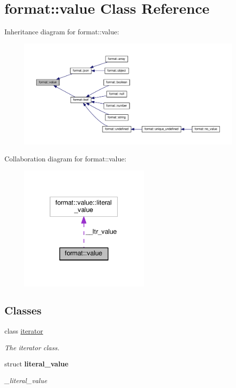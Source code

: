 \hypertarget{classformat_1_1value}{}\section{format\+:\+:value Class Reference}
\label{classformat_1_1value}


Inheritance diagram for format\+:\+:value\+:
\nopagebreak
\begin{figure}[H]
\begin{center}
\leavevmode
\includegraphics[width=350pt]{classformat_1_1value__inherit__graph}
\end{center}
\end{figure}


Collaboration diagram for format\+:\+:value\+:
\nopagebreak
\begin{figure}[H]
\begin{center}
\leavevmode
\includegraphics[width=183pt]{classformat_1_1value__coll__graph}
\end{center}
\end{figure}
\subsection*{Classes}
\begin{DoxyCompactItemize}
\item 
class \hyperlink{classformat_1_1value_1_1iterator}{iterator}
\begin{DoxyCompactList}\small\item\em The iterator class. \end{DoxyCompactList}\item 
struct {\bfseries literal\+\_\+value}
\begin{DoxyCompactList}\small\item\em \+\_\+literal\+\_\+value \end{DoxyCompactList}\end{DoxyCompactItemize}

